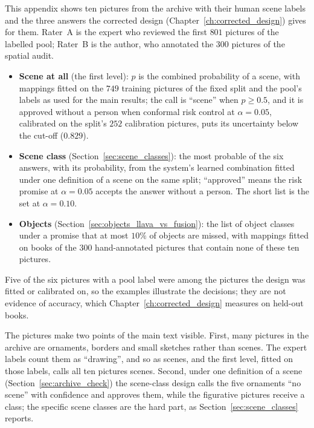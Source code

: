 
This appendix shows ten pictures from the archive with their human scene labels and the three answers the corrected design (Chapter~\ref{ch:corrected_design}) gives for them. Rater~A is the expert who reviewed the first $801$ pictures of the labelled pool; Rater~B is the author, who annotated the $300$ pictures of the spatial audit.
\begin{itemize}
    \item \textbf{Scene at all} (the first level): $p$ is the combined probability of a scene, with mappings fitted on the $749$ training pictures of the fixed split and the pool's labels as used for the main results; the call is ``scene'' when $p \ge 0.5$, and it is approved without a person when conformal risk control at $\alpha = 0.05$, calibrated on the split's $252$ calibration pictures, puts its uncertainty below the cut-off ($0.829$).
    \item \textbf{Scene class} (Section~\ref{sec:scene_classes}): the most probable of the six answers, with its probability, from the system's learned combination fitted under one definition of a scene on the same split; ``approved'' means the risk promise at $\alpha=0.05$ accepts the answer without a person. The short list is the set at $\alpha=0.10$.
    \item \textbf{Objects} (Section~\ref{sec:objects_llava_vs_fusion}): the list of object classes under a promise that at most $10\%$ of objects are missed, with mappings fitted on books of the $300$ hand-annotated pictures that contain none of these ten pictures.
\end{itemize}
Five of the six pictures with a pool label were among the pictures the design was fitted or calibrated on, so the examples illustrate the decisions; they are not evidence of accuracy, which Chapter~\ref{ch:corrected_design} measures on held-out books.

The pictures make two points of the main text visible. First, many pictures in the archive are ornaments, borders and small sketches rather than scenes. The expert labels count them as ``drawing'', and so as scenes, and the first level, fitted on those labels, calls all ten pictures scenes. Second, under one definition of a scene (Section~\ref{sec:archive_check}) the scene-class design calls the five ornaments ``no scene'' with confidence and approves them, while the figurative pictures receive a class; the specific scene classes are the hard part, as Section~\ref{sec:scene_classes} reports.

